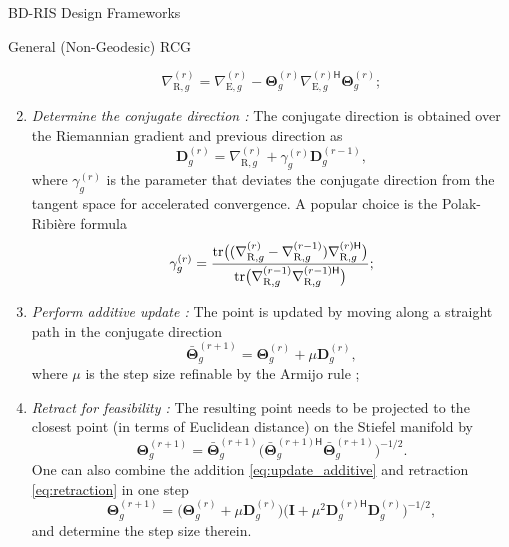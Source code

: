 \begin{section}{BD-RIS Design Frameworks}
\begin{subsection}{General (Non-Geodesic) RCG}
\begin{enumerate}
\begin{equation}
				\nabla_{\mathrm{R},g}^{(r)} = \nabla_{\mathrm{E},g}^{(r)} - \mathbf{\Theta}_g^{(r)} {\nabla_{\mathrm{E},g}^{(r)\mathsf{H}}} \mathbf{\Theta}_g^{(r)};
				\label{eq:gradient_riemannian}
			\end{equation}
		\item \emph{Determine the conjugate direction \cite{Nocedal2006}:} The conjugate direction is obtained over the Riemannian gradient and previous direction as
			\begin{equation}
				\mathbf{D}_g^{(r)} = \nabla_{\mathrm{R},g}^{(r)} + \gamma_g^{(r)} \mathbf{D}_g^{(r-1)}, %
				\label{eq:direction_cg}
			\end{equation}
			where $\gamma_g^{(r)}$ is the parameter that deviates the conjugate direction from the tangent space for accelerated convergence. A popular choice is the Polak-Ribi\`{e}re formula
			\begin{equation}
				\gamma_g^{(r)} = \frac{\tr\bigl((\nabla_{\mathrm{R},g}^{(r)} - \nabla_{\mathrm{R},g}^{(r-1)}) {\nabla_{\mathrm{R},g}^{(r)\mathsf{H}}}\bigr)}{\tr\bigl(\nabla_{\mathrm{R},g}^{(r-1)} {\nabla_{\mathrm{R},g}^{(r-1)\mathsf{H}}}\bigr)}; %
				\label{eq:parameter_cg}
			\end{equation}
		\item \emph{Perform additive update \cite{Pan2022d}:} The point is updated by moving along a straight path in the conjugate direction
			\begin{equation}
				\bar{\mathbf{\Theta}}_g^{(r+1)} = \mathbf{\Theta}_g^{(r)} + \mu \mathbf{D}_g^{(r)},
				\label{eq:update_additive}
			\end{equation}
			where $\mu$ is the step size refinable by the Armijo rule \cite{Armijo1966};
		\item \emph{Retract for feasibility \cite{Absil2009,Li2023b}:} The resulting point needs to be projected to the closest point (in terms of Euclidean distance) on the Stiefel manifold by
			\begin{equation}
				\mathbf{\Theta}_g^{(r+1)} = \bar{\mathbf{\Theta}}_g^{(r+1)} \bigl({\bar{\mathbf{\Theta}}_g^{(r+1)\mathsf{H}}} \bar{\mathbf{\Theta}}_g^{(r+1)}\bigr)^{-1/2}.
				\label{eq:retraction}
			\end{equation}
			One can also combine the addition \eqref{eq:update_additive} and retraction \eqref{eq:retraction} in one step
			\begin{equation}
				\mathbf{\Theta}_g^{(r+1)} = \bigl(\mathbf{\Theta}_g^{(r)} + \mu \mathbf{D}_g^{(r)}\bigr) \bigl( \mathbf{I} + \mu^2 {\mathbf{D}_g^{(r)\mathsf{H}}} \mathbf{D}_g^{(r)} \bigr)^{-1/2},
				\label{eq:add_then_retract}
			\end{equation}
			and determine the step size therein.
	\end{enumerate}


\end{subsection}
\end{section}
